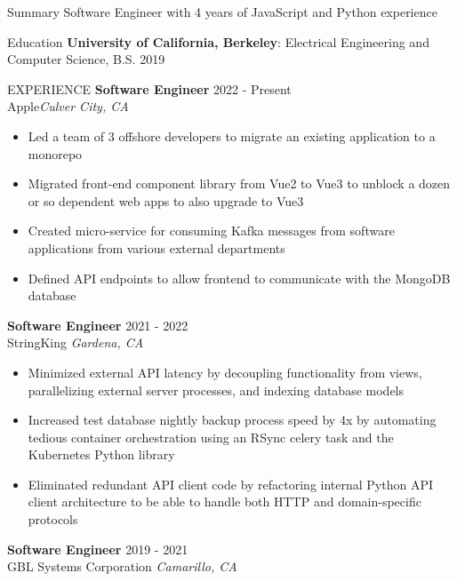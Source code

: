 \documentclass{resume}
\begin{document}
    \begin{rSection}{Summary}
        {Software Engineer with 4 years of JavaScript and Python experience}
    \end{rSection}

    \begin{rSection}{Education}
        {\bf University of California, Berkeley}: Electrical Engineering and Computer Science, B.S. \hfill {2019}
    \end{rSection}

    \begin{rSection}{EXPERIENCE}
        \textbf{Software Engineer} \hfill 2022 - Present\\
        Apple\hfill \textit{Culver City, CA}
        \begin{itemize}
            \itemsep -3pt {} 
            \item Led a team of 3 offshore developers to migrate an existing application to a monorepo
            \item Migrated front-end component library from Vue2 to Vue3 to unblock a dozen or so dependent web apps to also upgrade to Vue3
            \item Created micro-service for consuming Kafka messages from software applications from various external departments
            \item Defined API endpoints to allow frontend to communicate with the MongoDB database
        \end{itemize}
        \textbf{Software Engineer} \hfill 2021 - 2022\\
        StringKing \hfill \textit{Gardena, CA}
        \begin{itemize}
            \itemsep -3pt {} 
            \item Minimized external API latency by decoupling functionality from views, parallelizing external server processes, and indexing database models
            \item Increased test database nightly backup process speed by 4x by automating tedious container orchestration using an RSync celery task and the Kubernetes Python library
            \item Eliminated redundant API client code by refactoring internal Python API client architecture to be able to handle both HTTP and domain-specific protocols
        \end{itemize}
        \textbf{Software Engineer} \hfill 2019 - 2021\\
        GBL Systems Corporation \hfill \textit{Camarillo, CA}

\end{rSection}
\end{document}
